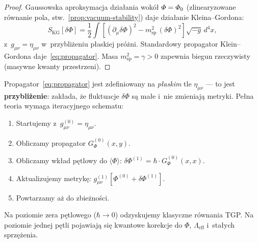 \begin{proof}
Gaussowska aproksymacja działania wokół $\varPhi = \varPhi_0$
(zlinearyzowane równanie pola, stw.~\ref{prop:vacuum-stability})
daje działanie Kleina--Gordona:
\begin{equation}
    S_{\mathrm{KG}}[\delta\Phi]
    = \frac{1}{2}\int\!\left[
        (\partial_\mu\delta\Phi)^2
        - m_{\mathrm{sp}}^2\,(\delta\Phi)^2
    \right]\sqrt{-g}\,d^4x,
\end{equation}
z~$g_{\mu\nu} = \eta_{\mu\nu}$ w~przybliżeniu płaskiej próżni.
Standardowy propagator Klein--Gordona daje~\eqref{eq:propagator}.
Masa $m_{\mathrm{sp}}^2 = \gamma > 0$ zapewnia biegun rzeczywisty
(masywne kwanty przestrzeni).
\end{proof}

\begin{remark}\label{rem:self-ref-prop}
Propagator~\eqref{eq:propagator} jest zdefiniowany na \emph{płaskim}
tle $\eta_{\mu\nu}$ --- to jest \textbf{przybliżenie}: zakłada,
że fluktuacje $\delta\Phi$ są małe i~nie zmieniają metryki.
Pełna teoria wymaga iteracyjnego schematu:
\begin{enumerate}[nosep]
    \item Startujemy z~$g_{\mu\nu}^{(0)} = \eta_{\mu\nu}$.
    \item Obliczamy propagator $G_\Phi^{(0)}(x,y)$.
    \item Obliczamy wkład pętlowy do $\langle\Phi\rangle$:
          $\delta\Phi^{(1)} = \hbar \cdot G_\Phi^{(0)}(x,x)$.
    \item Aktualizujemy metrykę: $g^{(1)}_{\mu\nu}[\Phi^{(0)}
          + \delta\Phi^{(1)}]$.
    \item Powtarzamy aż do zbieżności.
\end{enumerate}
Na poziomie zera pętlowego ($\hbar \to 0$) odzyskujemy klasyczne
równania TGP. Na poziomie jednej pętli pojawiają się kwantowe
korekcje do $\Phi$, $\Lambda_{\mathrm{eff}}$ i~stałych sprzężenia.
\end{remark}

